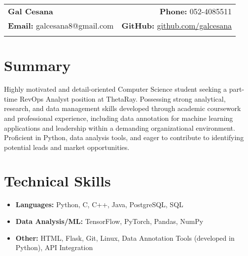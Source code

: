 \usepackage{enumitem}
\usepackage{titlesec}
\usepackage{titling}
\usepackage{parskip}
\usepackage[margin=0.75in]{geometry}
\usepackage{hyperref}

\titleformat{\section}{\large\bfseries}{}{0em}{}[\titlerule]
\renewcommand{\maketitle}{
    \hspace{-1em}\begin{tabular*}{\textwidth}{l@{\extracolsep{\fill}}r}
        \textbf{\LARGE Gal Cesana} & \textbf{Phone:} 052-4085511 \\
        \textbf{Email:} galcesana8@gmail.com & \textbf{GitHub:} \href{https://github.com/galcesana}{github.com/galcesana} \\
         &  \\
    \end{tabular*}
    \vspace{1em}
}



\maketitle

\section*{Summary}
Highly motivated and detail-oriented Computer Science student seeking a part-time RevOps Analyst position at ThetaRay.  Possessing strong analytical, research, and data management skills developed through academic coursework and professional experience, including data annotation for machine learning applications and leadership within a demanding organizational environment. Proficient in Python, data analysis tools, and eager to contribute to identifying potential leads and market opportunities.

\section*{Technical Skills}
\begin{itemize}[noitemsep,nolistsep]
    \item \textbf{Languages:} Python, C, C++, Java, PostgreSQL, SQL
    \item \textbf{Data Analysis/ML:} TensorFlow, PyTorch, Pandas, NumPy
    \item \textbf{Other:}  HTML, Flask, Git, Linux, Data Annotation Tools (developed in Python), API Integration
\end{itemize}


